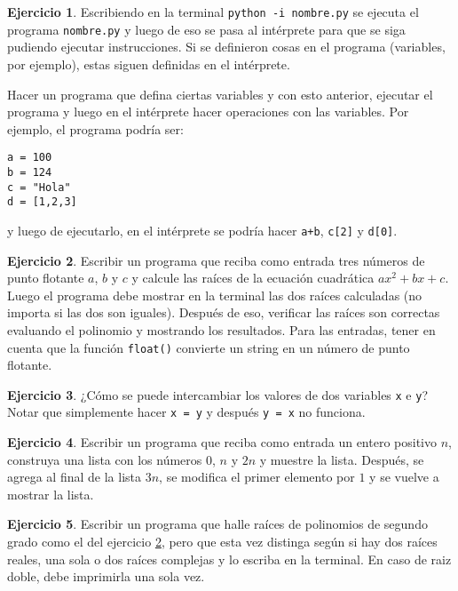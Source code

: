 \documentclass[a4paper,12pt]{book}
\theoremstyle{definition}
\newtheorem{ejercicio}{Ejercicio}
\begin{document}
	\begin{ejercicio}\label{ejer-pythonInteractive}
		Escribiendo en la terminal {\tt python -i nombre.py} se ejecuta el programa {\tt nombre.py} y luego de eso se pasa al intérprete para que se siga pudiendo ejecutar instrucciones. Si se definieron cosas en el programa (variables, por ejemplo), estas siguen definidas en el intérprete.
		
		Hacer un programa que defina ciertas variables y con esto anterior, ejecutar el programa y luego en el intérprete hacer operaciones con las variables.
		Por ejemplo, el programa podría ser:
		\begin{verbatim}
a = 100
b = 124
c = "Hola"
d = [1,2,3]
		\end{verbatim}
		y luego de ejecutarlo, en el intérprete se podría hacer {\tt a+b}, {\tt c[2]} y {\tt d[0]}.
	\end{ejercicio}

	\begin{ejercicio}\label{ejer-polSegGrado}
		Escribir un programa que reciba como entrada tres números de punto flotante $a$, $b$ y $c$ y calcule las raíces de la ecuación cuadrática $ax^2+bx+c$. Luego el programa debe mostrar en la terminal las dos raíces calculadas (no importa si las dos son iguales). Después de eso, verificar las raíces son correctas evaluando el polinomio y mostrando los resultados. Para las entradas, tener en cuenta que la función {\tt float()} convierte un string en un número de punto flotante.
	\end{ejercicio}
	
	\begin{ejercicio}
		¿Cómo se puede intercambiar los valores de dos variables {\tt x} e {\tt y}? Notar que simplemente hacer {\tt x = y} y después {\tt y = x} no funciona.
	\end{ejercicio}
	
	\begin{ejercicio}
		 Escribir un programa que reciba como entrada un entero positivo $n$, construya una lista con los números $0$, $n$ y $2n$ y muestre la lista. Después, se agrega al final de la lista $3n$, se modifica el primer elemento por $1$ y se vuelve a mostrar la lista.
	\end{ejercicio}
	
	\begin{ejercicio}
		Escribir un programa que halle raíces de polinomios de segundo grado como el del ejercicio \ref{ejer-polSegGrado}, pero que esta vez distinga según si hay dos raíces reales, una sola o dos raíces complejas y lo escriba en la terminal. En caso de raiz doble, debe imprimirla una sola vez.
	\end{ejercicio}
	
\end{document}
